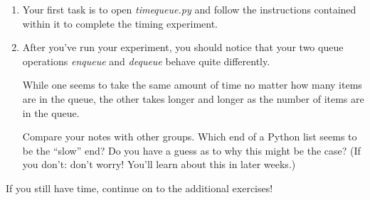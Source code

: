 \documentclass[12pt]{article}
\begin{document}
\begin{enumerate}[1.]
    \item Your first task is to open \textit{timequeue.py} and follow the instructions
    contained within it to complete the timing experiment.

    \item After you’ve run your experiment, you should notice that your two queue
    operations \textit{enqueue} and \textit{dequeue} behave quite differently.

    \bigskip

    While one seems to take the same amount of time no matter how many items are
    in the queue, the other takes longer and longer as the number of items are in
    the queue.

    \bigskip

    Compare your notes with other groups.
    Which end of a Python list seems to be the “slow” end? Do you have a guess
    as to why this might be the case? (If you don't: don't worry! You'll learn
    about this in later weeks.)

\end{enumerate}

\bigskip

If you still have time, continue on to the additional exercises!
\end{document}
